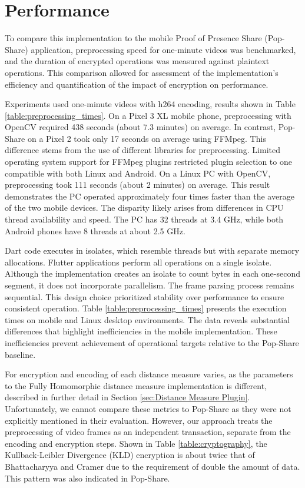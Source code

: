 \section{Performance}

To compare this implementation to the mobile Proof of Presence Share (Pop-Share) application, preprocessing speed for one-minute videos was benchmarked, and the duration of encrypted operations was measured against plaintext operations. This comparison allowed for assessment of the implementation's efficiency and quantification of the impact of encryption on performance.



Experiments used one-minute videos with h264 encoding, results shown in Table \ref{table:preprocessing_times}. On a Pixel 3 XL mobile phone, preprocessing with OpenCV required 438 seconds (about 7.3 minutes) on average. In contrast, Pop-Share on a Pixel 2 took only 17 seconds on average using FFMpeg. This difference stems from the use of different libraries for preprocessing. Limited operating system support for FFMpeg plugins restricted plugin selection to one compatible with both Linux and Android. On a Linux PC with OpenCV, preprocessing  took 111 seconds (about 2 minutes) on average. This result demonstrates the PC operated approximately four times faster than the average of the two mobile devices. The disparity likely arises from differences in CPU thread availability and speed. The PC has 32 threads at 3.4 GHz, while both Android phones have 8 threads at about 2.5 GHz.

Dart code executes in isolates, which resemble threads but with separate memory allocations. Flutter applications perform all operations on a single isolate. Although the implementation creates an isolate to count bytes in each one-second segment, it does not incorporate parallelism. The frame parsing process remains sequential. This design choice prioritized stability over performance to ensure consistent operation. Table \ref{table:preprocessing_times} presents the execution times on mobile and Linux desktop environments. The data reveals substantial differences that highlight inefficiencies in the mobile implementation. These inefficiencies prevent achievement of operational targets relative to the Pop-Share baseline.

For encryption and encoding of each distance measure varies, as the parameters to the Fully Homomorphic distance measure implementation is different, described in further detail in Section \ref{sec:Distance Measure Plugin}. Unfortunately, we cannot compare these metrics to Pop-Share as they were not explicitly mentioned in their evaluation. However, our approach treats the preprocessing of video frames as an independent transaction, separate from the encoding and encryption steps. Shown in Table \ref{table:cryptography}, the Kullback-Leibler Divergence (KLD) encryption is about twice that of Bhattacharyya and Cramer due to the requirement of double the amount of data. This pattern was also indicated in Pop-Share.

